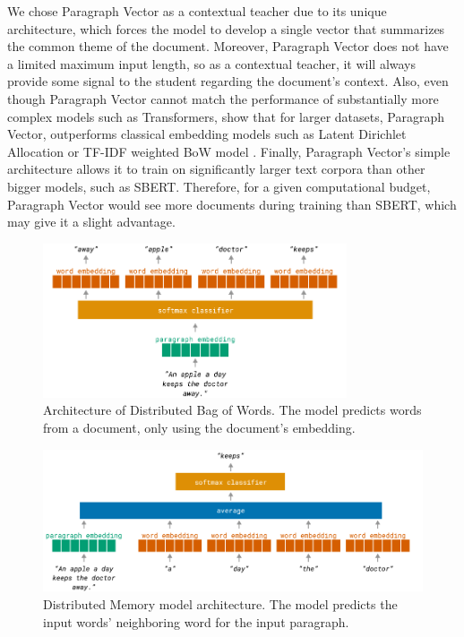 We chose Paragraph Vector as a contextual teacher due to its unique
architecture, which forces the model to develop a single vector that summarizes
the common theme of the document. Moreover, Paragraph Vector does not have a
limited maximum input length, so as a contextual teacher, it will always
provide some signal to the student regarding the document's context. Also, even
though Paragraph Vector cannot match the performance of substantially more
complex models such as Transformers, \cite{dai2015document} show that for
larger datasets, Paragraph Vector, outperforms classical embedding models such
as Latent Dirichlet Allocation \citep{blei2003latent} or TF-IDF weighted BoW
model \citep{harris1954distributional}. Finally, Paragraph Vector's simple
architecture allows it to train on significantly larger text corpora than other
bigger models, such as SBERT. Therefore, for a given computational budget,
Paragraph Vector would see more documents during training than SBERT, which may
give it a slight advantage.

\begin{figure}
  \centering
  \includegraphics[width=0.8\textwidth]{./img/dbow_architecture.pdf}

  \caption{Architecture of Distributed Bag of Words. The model predicts words
  from a document, only using the document's embedding.}

  \label{fig:dbow}
\end{figure}

\begin{figure}
  \centering
  \includegraphics[width=1\textwidth]{./img/dm_architecture.pdf}

  \caption{Distributed Memory model architecture. The model predicts the input
  words' neighboring word for the input paragraph.}

  \label{fig:dm}

\end{figure}

